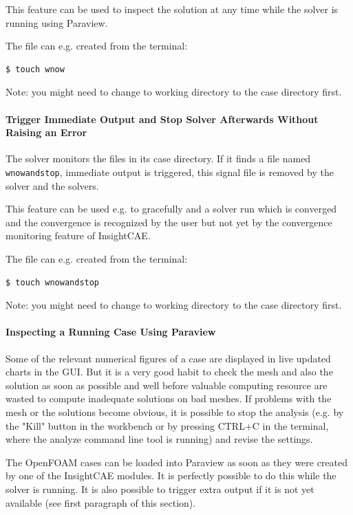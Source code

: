 This feature can be used to inspect the solution at any time while the solver is running using Paraview.

The file can e.g. created from the terminal:

\begin{lstlisting}
$ touch wnow
\end{lstlisting}

Note: you might need to change to working directory to the case directory first.

\paragraph{Trigger Immediate Output and Stop Solver Afterwards Without Raising an Error}
\label{par:wnowandstop}
The solver monitors the files in its case directory.
If it finds a file named \verb!wnowandstop!, immediate output is triggered, this signal file is removed by the solver and the solvers.

This feature can be used e.g. to gracefully and a solver run which is converged and the convergence is recognized by the user but not yet by the convergence monitoring feature of InsightCAE.

The file can e.g. created from the terminal:

\begin{lstlisting}
$ touch wnowandstop
\end{lstlisting}

Note: you might need to change to working directory to the case directory first.



\paragraph{Inspecting a Running Case Using Paraview}
\label{par:isPVpy}

Some of the relevant numerical figures of a case are displayed in live updated charts in the GUI.
But it is a very good habit to check the mesh and also the solution as soon as possible and well before valuable computing resource are wasted to compute inadequate solutions on bad meshes.
If problems with the mesh or the solutions become obvious, it is possible to stop the analysis (e.g. by the "Kill" button in the workbench or by pressing CTRL+C in the terminal, where the analyze command line tool is running) and revise the settings.

The OpenFOAM cases can be loaded into Paraview as soon as they were created by one of the InsightCAE modules.
It is perfectly possible to do this while the solver is running.
It is also possible to trigger extra output if it is not yet available (see first paragraph of this section).


